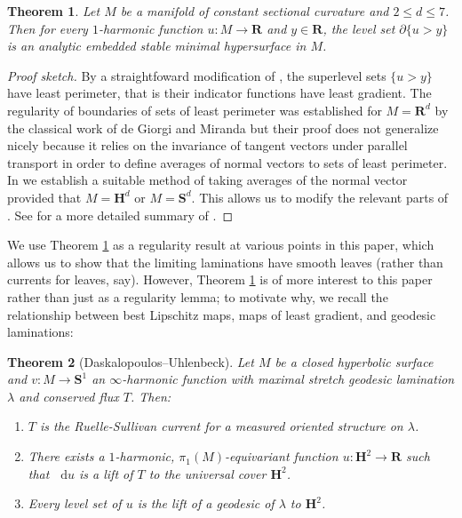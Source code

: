 \documentclass[reqno,11pt]{amsart}
\newcommand{\RR}{\mathbf{R}}
\newcommand{\Hyp}{\mathbf H}
\newcommand{\Sph}{\mathbf S}
\newcommand*\dif{\mathop{}\!\mathrm{d}}
\newtheorem{theorem}{Theorem}[section]
\theoremstyle{definition}
\numberwithin{equation}{section}
\begin{document}
\begin{theorem}\label{main thm of old paper}
Let $M$ be a manifold of constant sectional curvature and $2 \leq d \leq 7$.
Then for every $1$-harmonic function $u: M \to \RR$ and $y \in \RR$, the level set $\partial \{u > y\}$ is an analytic embedded stable minimal hypersurface in $M$.
\end{theorem}
\begin{proof}[Proof sketch]
By a straightfoward modification of \cite[Theorem 1]{BOMBIERI1969}, the superlevel sets $\{u > y\}$ have least perimeter, that is their indicator functions have least gradient.
The regularity of boundaries of sets of least perimeter was established for $M = \RR^d$ by the classical work of de Giorgi and Miranda \cite{deGiorgi61, Miranda66} but their proof does not generalize nicely because it relies on the invariance of tangent vectors under parallel transport in order to define averages of normal vectors to sets of least perimeter.
In \cite[\S3]{BackusFLG} we establish a suitable method of taking averages of the normal vector provided that $M = \Hyp^d$ or $M = \Sph^d$.
This allows us to modify the relevant parts of \cite{Miranda66}.
See \cite[\S1]{BackusFLG} for a more detailed summary of \cite{BackusFLG}.
\end{proof}

We use Theorem \ref{main thm of old paper} as a regularity result at various points in this paper, which allows us to show that the limiting laminations have smooth leaves (rather than currents for leaves, say).
However, Theorem \ref{main thm of old paper} is of more interest to this paper rather than just as a regularity lemma; to motivate why, we recall the relationship between best Lipschitz maps, maps of least gradient, and geodesic laminations:

\begin{theorem}[Daskalopoulos--Uhlenbeck]\label{DU theorem}
Let $M$ be a closed hyperbolic surface and $v: M \to \Sph^1$ an $\infty$-harmonic function with maximal stretch geodesic lamination $\lambda$ and conserved flux $T$. Then:
\begin{enumerate}
\item $T$ is the Ruelle-Sullivan current for a measured oriented structure on $\lambda$.
\item There exists a $1$-harmonic, $\pi_1(M)$-equivariant function $u: \Hyp^2 \to \RR$ such that $\dif u$ is a lift of $T$ to the universal cover $\Hyp^2$.
\item Every level set of $u$ is the lift of a geodesic of $\lambda$ to $\Hyp^2$.
\end{enumerate}
\end{theorem}
\end{document}
